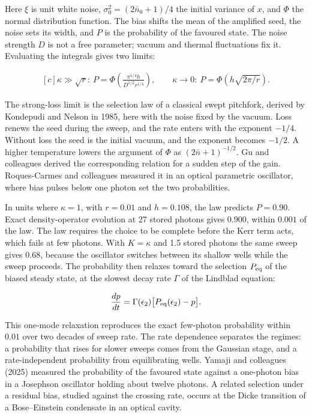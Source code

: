 \documentclass[11pt,oneside]{book}
\newenvironment{centeredalign}{\[\begin{gathered}[c]}{\end{gathered}\]}
\begin{document}
Here \(\xi\) is unit white noise, \(\sigma_0^2=(2\bar n_0+1)/4\) the initial variance of \(x\), and \(\Phi\) the normal distribution function. The bias shifts the mean of the amplified seed, the noise sets its width, and \(P\) is the probability of the favoured state. The noise strength \(D\) is not a free parameter; vacuum and thermal fluctuations fix it. Evaluating the integrals gives two limits:

\begin{centeredalign}
\kappa\gg\sqrt r:\ P=\Phi\!\left(\frac{\pi^{1/4}h}{D^{1/2}r^{1/4}}\right),\qquad
\kappa\to0:\ P=\Phi\!\left(h\sqrt{2\pi/r}\right).
\end{centeredalign}

The strong-loss limit is the selection law of a classical swept pitchfork, derived by Kondepudi and Nelson in 1985, here with the noise fixed by the vacuum. Loss renews the seed during the sweep, and the rate enters with the exponent \(-1/4\). Without loss the seed is the initial vacuum, and the exponent becomes \(-1/2\). A higher temperature lowers the argument of \(\Phi\) as \((2\bar n+1)^{-1/2}\). Gu and colleagues derived the corresponding relation for a sudden step of the gain. Roques-Carmes and colleagues measured it in an optical parametric oscillator, where bias pulses below one photon set the two probabilities.

In units where \(\kappa=1\), with \(r=0.01\) and \(h=0.108\), the law predicts \(P=0.90\). Exact density-operator evolution at 27 stored photons gives \(0.900\), within \(0.001\) of the law. The law requires the choice to be complete before the Kerr term acts, which fails at few photons. With \(K=\kappa\) and 1.5 stored photons the same sweep gives \(0.68\), because the oscillator switches between its shallow wells while the sweep proceeds. The probability then relaxes toward the selection \(P_{\rm eq}\) of the biased steady state, at the slowest decay rate \(\Gamma\) of the Lindblad equation:

\begin{centeredalign}
\frac{dp}{dt}=\Gamma(\epsilon_2)\big[P_{\rm eq}(\epsilon_2)-p\big].
\end{centeredalign}

This one-mode relaxation reproduces the exact few-photon probability within \(0.01\) over two decades of sweep rate. The rate dependence separates the regimes: a probability that rises for slower sweeps comes from the Gaussian stage, and a rate-independent probability from equilibrating wells. Yamaji and colleagues (2025) measured the probability of the favoured state against a one-photon bias in a Josephson oscillator holding about twelve photons. A related selection under a residual bias, studied against the crossing rate, occurs at the Dicke transition of a Bose--Einstein condensate in an optical cavity.
\end{document}
